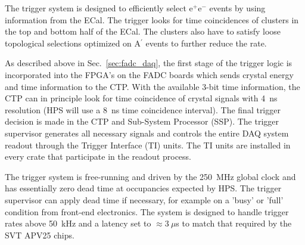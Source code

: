 

The trigger system is designed to efficiently select e$^{+}$e$^{-}$ events by 
using information from the ECal. The trigger looks for time coincidences of clusters in the top and bottom half of the ECal. The clusters also have to satisfy loose topological selections optimized on A$^{\prime}$ events to further reduce the rate. 

As described above in Sec.~\ref{sec:fadc_daq}, the first stage of the trigger logic is incorporated into the FPGA's on the FADC boards which sends crystal energy and time information to the CTP. With the available 3-bit time information, the CTP can in principle look for time coincidence of crystal signals with 4~ns resolution (HPS will use a 8~ns time coincidence interval). The final trigger decision is made in the CTP and Sub-System Processor (SSP). The trigger supervisor generates all necessary signals and controls the entire DAQ system readout through the Trigger Interface (TI) units. The TI units are installed in every crate that participate in the readout process. 

The trigger system is free-running and driven by the 250~MHz global clock and has essentially zero dead time at occupancies expected by HPS. The trigger supervisor can apply dead time if necessary, for example on a 'busy' or 'full' condition from front-end electronics. The system is designed to handle trigger rates above 50~kHz and a latency set to $\approx 3~\mu$s to match that required by the SVT APV25 chips. 


 







